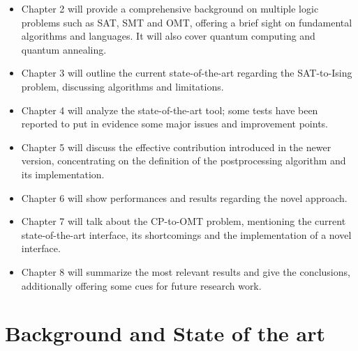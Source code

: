 \begin{itemize}
    \item Chapter 2 will provide a comprehensive background on multiple logic problems such as SAT, SMT and OMT, offering a brief sight on fundamental algorithms and languages. It will also cover quantum computing and quantum annealing.
    \item Chapter 3 will outline the current state-of-the-art regarding the SAT-to-Ising problem, discussing algorithms and limitations.
    \item Chapter 4 will analyze the state-of-the-art tool; some tests have been reported to put in evidence some major issues and improvement points.
    \item Chapter 5 will discuss the effective contribution introduced in the newer version, concentrating on the definition of the postprocessing algorithm and its implementation.
    \item Chapter 6 will show performances and results regarding the novel approach. 
    \item Chapter 7 will talk about the CP-to-OMT problem, mentioning the current state-of-the-art interface, its shortcomings and the implementation of a novel interface.
    \item Chapter 8 will summarize the most relevant results and give the conclusions, additionally offering some cues for future research work.
\end{itemize}

\newpage

\part{Background and State of the art}